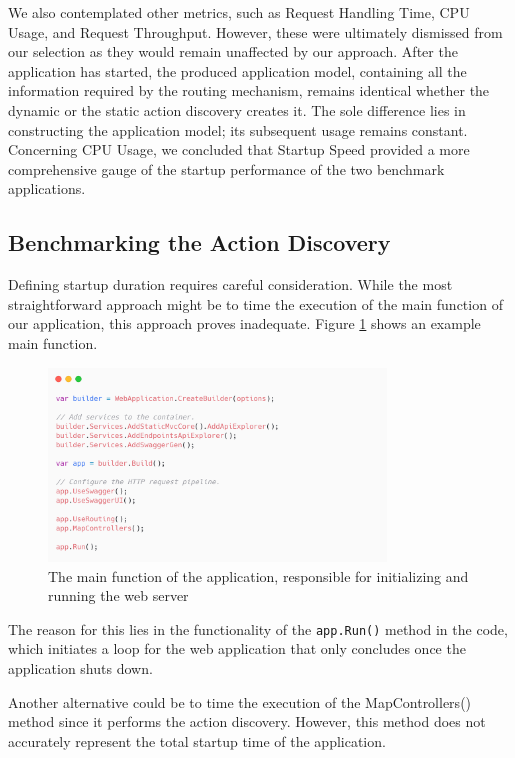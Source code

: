 We also contemplated other metrics, such as Request Handling Time, CPU Usage, and Request Throughput. However, these were ultimately dismissed from our selection as they would remain unaffected by our approach. After the application has started, the produced application model, containing all the information required by the routing mechanism, remains identical whether the dynamic or the static action discovery creates it. The sole difference lies in constructing the application model; its subsequent usage remains constant. Concerning CPU Usage, we concluded that Startup Speed provided a more comprehensive gauge of the startup performance of the two benchmark applications.

\subsection{Benchmarking the Action Discovery}

Defining startup duration requires careful consideration. While the most straightforward approach might be to time the execution of the main function of our application, this approach proves inadequate. Figure \ref{fig:startup-method} shows an example main function.

\begin{figure}[H]
\centering
\includegraphics[width=0.8\textwidth]{graphics/startup-method.png}
\caption{The main function of the application, responsible for initializing and running the web server}
\label{fig:startup-method}
\end{figure}

The reason for this lies in the functionality of the \texttt{app.Run()} method in the code, which initiates a loop for the web application that only concludes once the application shuts down.

Another alternative could be to time the execution of the MapControllers() method since it performs the action discovery. However, this method does not accurately represent the total startup time of the application.

